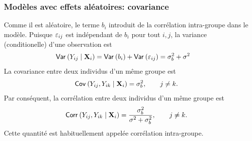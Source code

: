 \documentclass{beamer}
\begin{document}
\begin{frame}[fragile]
\frametitle{Modèles avec effets aléatoires: covariance}
Comme il est aléatoire, le terme $b_i$ introduit de la \alert{corrélation intra-groupe}
dans le modèle.  Puisque $\varepsilon_{ij}$ est indépendant de $b_i$ pour tout $i, j$, la variance (conditionelle) d'une observation est
\begin{align*}
{\mathsf{Var}_{}}\left(Y_{ij}\mid \mathbf{X}_i\right)&={\mathsf{Var}_{}}\left(b_i\right)+{\mathsf{Var}_{}}\left(\varepsilon_{ij}\right)=\sigma^2_b + \sigma^2_{\vphantom{b}}
\end{align*}
La covariance entre deux individus d'un même groupe est
\begin{align*}
{\mathsf{Cov}_{}}\left(Y_{ij}, Y_{ik}\mid \mathbf{X}_i\right)=\sigma^2_b, \qquad j\neq k.
\end{align*}
Par conséquent, la corrélation entre deux individus d'un même groupe est
\begin{align*}
{\mathsf{Corr}_{}}\left(Y_{ij}, Y_{ik}\mid \mathbf{X}_i\right)=\frac{\sigma^2_b}{\sigma^2_{\vphantom{b}}+\sigma^2_b}, \qquad  j\neq k.
\end{align*}
Cette quantité est habituellement appelée \alert{corrélation intra-groupe}.

\end{frame}
\end{document}
